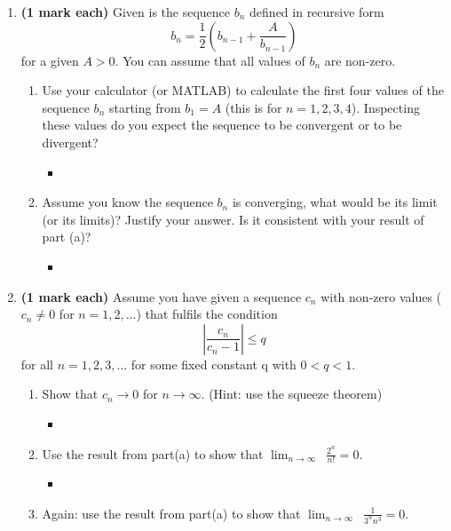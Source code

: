 \documentclass[12pt]{article}
\begin{document}
\begin{enumerate}[leftmargin=\labelsep]
\newpage

    \item {\bf (1 mark each)} Given is the sequence $b_n$ defined in recursive form
        \begin{equation*}
            b_n=\frac{1}{2}\left(b_{n-1}+\frac{A}{b_{n-1}} \right)
        \end{equation*} for a given $A>0$. You can assume that all values of $b_n$ are non-zero.
        \begin{enumerate}
            \item Use your calculator (or MATLAB) to calculate the first four values of the sequence $b_n$ starting from $b_1=A$ (this is for $n=1,2,3,4$). Inspecting these values do you expect the sequence to be convergent or to be divergent?
                \begin{itemize}[label={}]
                    \item 
                \end{itemize}
            \item Assume you know the sequence $b_n$ is converging, what would be its limit (or its limits)? Justify your answer. Is it consistent with your result of part (a)?
                \begin{itemize}[label={}]
                    \item 
                \end{itemize}
        \end{enumerate}

\newpage

    \item {\bf (1 mark each)} Assume you have given a sequence $c_n$ with non-zero values ($c_n\neq0$ for $n=1,2,\dots$) that fulfils the condition
        \begin{equation}
            \left|\frac{c_n}{c_n-1}\right|\leq q
        \end{equation} for all $n=1,2,3,\dots$ for some fixed constant q with $0<q<1$.
        \begin{enumerate}
            \item Show that $c_n\to0$ for $n\to \infty$. (Hint: use the squeeze theorem)
                \begin{itemize}[label={}]
                    \item 
                \end{itemize}
            \item Use the result from part(a) to show that $\displaystyle{\lim_{n \to \infty}}\,\,\, \frac{2^n}{n!}=0$.
                \begin{itemize}[label={}]
                    \item 
                \end{itemize}
            \item Again: use the result from part(a) to show that $\displaystyle{\lim_{n \to \infty}}\,\,\, \frac{1}{3^nn^3}=0$.
        \end{enumerate}


\end{enumerate}
\end{document}
